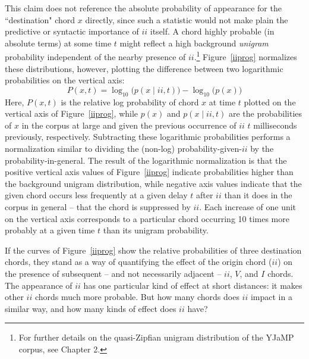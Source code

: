 This claim does not reference the absolute probability of appearance for the ``destination" chord $x$ directly, since such a statistic would not make plain the predictive or syntactic importance of $ii$ itself.  A chord highly probable (in absolute terms) at some time $t$ might reflect a high background \emph{unigram} probability independent of the nearby presence of $ii$.\footnote{For further details on the quasi-Zipfian unigram distribution of the YJaMP corpus, see Chapter 2.}  Figure~\ref{iiprog} normalizes these distributions, however, plotting the difference between two logarithmic probabilities on the vertical axis:
\begin{equation}
P(x,t) = \log_{10} \big( p(x\mid ii,t) \big) - \log_{10} \big( p(x) \big)
\end{equation}
Here, $P(x,t)$ is the relative log probability of chord $x$ at time $t$ plotted on the vertical axis of Figure~\ref{iiprog}, while $p(x)$ and $p(x\mid ii,t)$ are the probabilities of $x$ in the corpus at large and given the previous occurrence of $ii$ $t$ milliseconds previously, respectively.  Subtracting these logarithmic probabilities performs a normalization similar to dividing the (non-log) probability-given-$ii$ by the probability-in-general.  The result of the logarithmic normalization is that the positive vertical axis values of Figure~\ref{iiprog} indicate probabilities higher than the background unigram distribution, while negative axis values indicate that the given chord occurs less frequently at a given delay $t$ after $ii$ than it does in the corpus in general -- that the chord is suppressed by $ii$.  Each increase of one unit on the vertical axis corresponds to a particular chord occurring 10 times more probably at a given time $t$ than its unigram probability.

If the curves of Figure~\ref{iiprog} show the relative probabilities of three destination chords, they stand as a way of quantifying the effect of the origin chord ($ii$) on the presence of subsequent -- and not necessarily adjacent -- $ii$, $V$, and $I$ chords.  The appearance of $ii$ has one particular kind of effect at short distances: it makes other $ii$ chords much more probable.  But how many chords does $ii$ impact in a similar way, and how many kinds of effect does $ii$ have?

